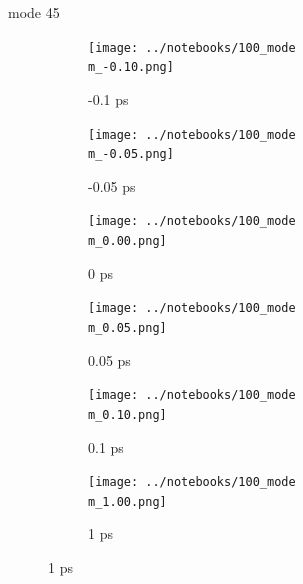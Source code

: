\documentclass{beamer}
\newcommand\w{0.32}
\begin{document}
\renewcommand\m{45}
\begin{frame}{mode \m}
	\begin{figure}
		\centering
		\begin{subfigure}[b]{\w\textwidth}
			\centering
			\texttt{[image: ../notebooks/100\_mode\\m\_-0.10.png]}
			\caption{-0.1 ps}
		\end{subfigure}
		\begin{subfigure}[b]{\w\textwidth}
			\centering
			\texttt{[image: ../notebooks/100\_mode\\m\_-0.05.png]}
			\caption{-0.05 ps}
		\end{subfigure}
		\begin{subfigure}[b]{\w\textwidth}
			\centering
			\texttt{[image: ../notebooks/100\_mode\\m\_0.00.png]}
			\caption{0 ps}
		\end{subfigure}
		\begin{subfigure}[b]{\w\textwidth}
			\centering
			\texttt{[image: ../notebooks/100\_mode\\m\_0.05.png]}
			\caption{0.05 ps}
		\end{subfigure}
		\begin{subfigure}[b]{\w\textwidth}
			\centering
			\texttt{[image: ../notebooks/100\_mode\\m\_0.10.png]}
			\caption{0.1 ps}
		\end{subfigure}
		\begin{subfigure}[b]{\w\textwidth}
			\centering
			\texttt{[image: ../notebooks/100\_mode\\m\_1.00.png]}
			\caption{1 ps}
		\end{subfigure}
	\end{figure}
\end{frame}
\end{document}
